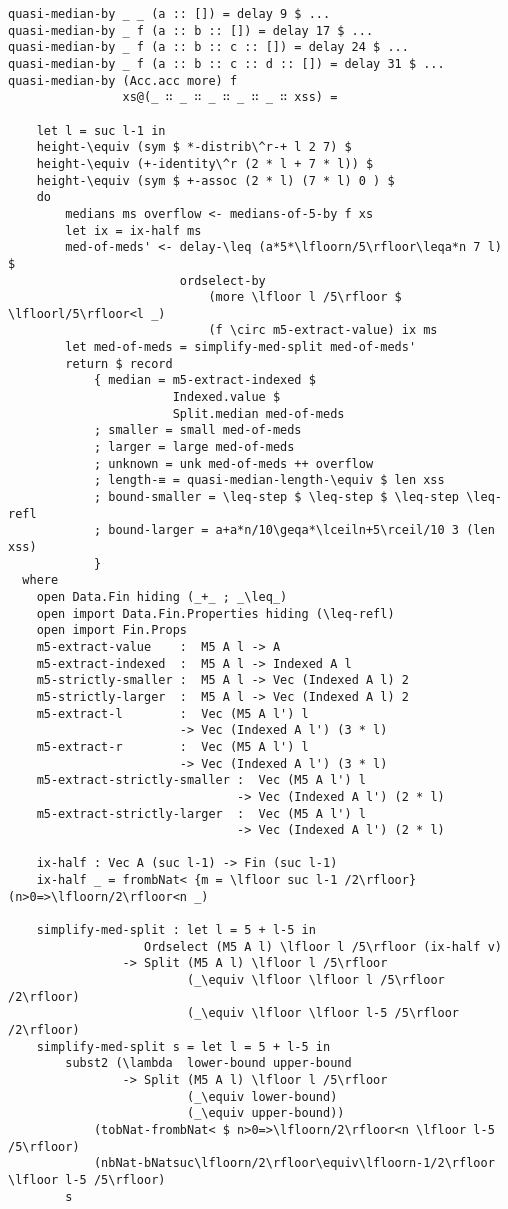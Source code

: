 \begin{lstlisting}[caption={Quasi-Median},label={lst:median:quasimedian}]
quasi-median-by _ _ (a :: []) = delay 9 $ ...
quasi-median-by _ f (a :: b :: []) = delay 17 $ ...
quasi-median-by _ f (a :: b :: c :: []) = delay 24 $ ...
quasi-median-by _ f (a :: b :: c :: d :: []) = delay 31 $ ...
quasi-median-by (Acc.acc more) f
                xs@(_ ∷ _ ∷ _ ∷ _ ∷ _ ∷ xss) =

    let l = suc l-1 in
    height-\equiv (sym $ *-distrib\^r-+ l 2 7) $
    height-\equiv (+-identity\^r (2 * l + 7 * l)) $
    height-\equiv (sym $ +-assoc (2 * l) (7 * l) 0 ) $
    do
        medians ms overflow <- medians-of-5-by f xs
        let ix = ix-half ms
        med-of-meds' <- delay-\leq (a*5*\lfloorn/5\rfloor\leqa*n 7 l) $
                        ordselect-by
                            (more \lfloor l /5\rfloor $ \lfloorl/5\rfloor<l _)
                            (f \circ m5-extract-value) ix ms
        let med-of-meds = simplify-med-split med-of-meds'
        return $ record
            { median = m5-extract-indexed $
                       Indexed.value $
                       Split.median med-of-meds
            ; smaller = small med-of-meds
            ; larger = large med-of-meds
            ; unknown = unk med-of-meds ++ overflow
            ; length-≡ = quasi-median-length-\equiv $ len xss
            ; bound-smaller = \leq-step $ \leq-step $ \leq-step \leq-refl
            ; bound-larger = a+a*n/10\geqa*\lceiln+5\rceil/10 3 (len xss)
            }
  where
    open Data.Fin hiding (_+_ ; _\leq_)
    open import Data.Fin.Properties hiding (\leq-refl)
    open import Fin.Props
    m5-extract-value    :  M5 A l -> A
    m5-extract-indexed  :  M5 A l -> Indexed A l
    m5-strictly-smaller :  M5 A l -> Vec (Indexed A l) 2
    m5-strictly-larger  :  M5 A l -> Vec (Indexed A l) 2
    m5-extract-l        :  Vec (M5 A l') l
                        -> Vec (Indexed A l') (3 * l)
    m5-extract-r        :  Vec (M5 A l') l
                        -> Vec (Indexed A l') (3 * l)
    m5-extract-strictly-smaller :  Vec (M5 A l') l
                                -> Vec (Indexed A l') (2 * l)
    m5-extract-strictly-larger  :  Vec (M5 A l') l
                                -> Vec (Indexed A l') (2 * l)

    ix-half : Vec A (suc l-1) -> Fin (suc l-1)
    ix-half _ = frombNat< {m = \lfloor suc l-1 /2\rfloor} (n>0=>\lfloorn/2\rfloor<n _)

    simplify-med-split : let l = 5 + l-5 in
                   Ordselect (M5 A l) \lfloor l /5\rfloor (ix-half v)
                -> Split (M5 A l) \lfloor l /5\rfloor
                         (_\equiv \lfloor \lfloor l /5\rfloor /2\rfloor)
                         (_\equiv \lfloor \lfloor l-5 /5\rfloor /2\rfloor)
    simplify-med-split s = let l = 5 + l-5 in
        subst2 (\lambda  lower-bound upper-bound
                -> Split (M5 A l) \lfloor l /5\rfloor
                         (_\equiv lower-bound)
                         (_\equiv upper-bound))
            (tobNat-frombNat< $ n>0=>\lfloorn/2\rfloor<n \lfloor l-5 /5\rfloor)
            (nbNat-bNatsuc\lfloorn/2\rfloor\equiv\lfloorn-1/2\rfloor \lfloor l-5 /5\rfloor)
        s


\end{lstlisting}
